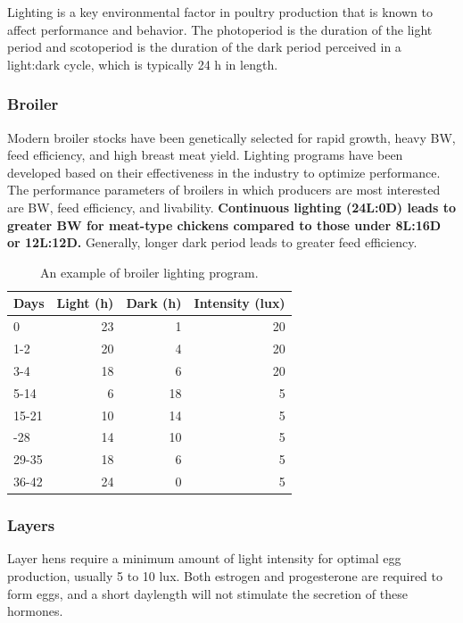 \documentclass[]{book}
\begin{document}
Lighting is a key environmental factor in poultry production that is known to affect performance and behavior. The photoperiod is the duration of the light period and scotoperiod is the duration of the dark period perceived in a light:dark cycle, which is typically 24 h in length.

\hypertarget{broiler}{%
\subsubsection{Broiler}\label{broiler}}

Modern broiler stocks have been genetically selected for rapid growth, heavy BW, feed efficiency, and high breast meat yield. Lighting programs have been developed based on their effectiveness in the industry to optimize performance. The performance parameters of broilers in which producers are most interested are BW, feed efficiency, and livability. \textbf{Continuous lighting (24L:0D) leads to greater BW for meat-type chickens compared to those under 8L:16D or 12L:12D.} Generally, longer dark period leads to greater feed efficiency.

\begin{table}

\caption{\label{tab:lightening}An example of broiler lighting program.}
\centering
\begin{tabular}[t]{lrrr}
\toprule
Days & Light (h) & Dark (h) & Intensity (lux)\\
\midrule
0 & 23 & 1 & 20\\
1-2 & 20 & 4 & 20\\
3-4 & 18 & 6 & 20\\
5-14 & 6 & 18 & 5\\
15-21 & 10 & 14 & 5\\
\addlinespace
22-28 & 14 & 10 & 5\\
29-35 & 18 & 6 & 5\\
36-42 & 24 & 0 & 5\\
\bottomrule
\end{tabular}
\end{table}

\hypertarget{layers}{%
\subsubsection{Layers}\label{layers}}

Layer hens require a minimum amount of light intensity for optimal egg production, usually 5 to 10 lux. Both estrogen and progesterone are required to form eggs, and a short daylength will not stimulate the secretion of these hormones.
\end{document}
